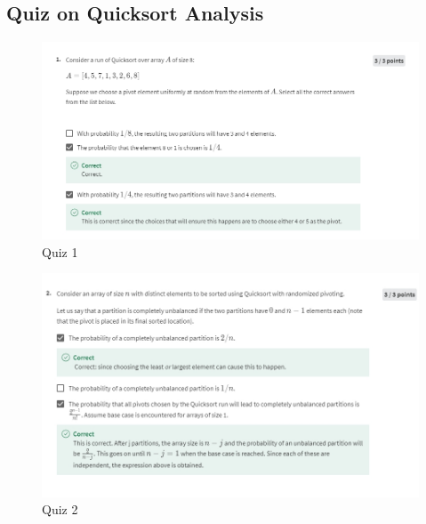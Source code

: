 \documentclass{article}
\begin{document}
\subsection{Quiz on Quicksort Analysis}

\begin{figure}[H]
    \includegraphics[width=\textwidth]{quicksortanalysisquiz1.png}
    \caption{Quiz 1\\}
\end{figure}

\begin{figure}[H]
    \includegraphics[width=\textwidth]{quicksortanalysisquiz2.png}
    \caption{Quiz 2\\}
\end{figure}
\end{document}
